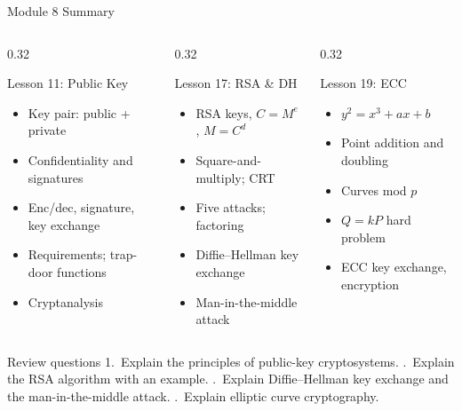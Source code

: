 \documentclass[aspectratio=169,11pt,xcolor={table}]{beamer}
\begin{document}
\begin{frame}{Module 8 Summary}
  \begin{columns}[T]
    \begin{column}{0.32\textwidth}
      \begin{block}{Lesson 11: Public Key}
        \scriptsize
        \begin{itemize}\setlength{\itemsep}{0pt}
          \item Key pair: public + private
          \item Confidentiality and signatures
          \item Enc/dec, signature, key exchange
          \item Requirements; trap-door functions
          \item Cryptanalysis
        \end{itemize}
      \end{block}
    \end{column}
    \begin{column}{0.32\textwidth}
      \begin{alertblock}{Lesson 17: RSA \& DH}
        \scriptsize
        \begin{itemize}\setlength{\itemsep}{0pt}
          \item RSA keys, $C = M^e$, $M = C^d$
          \item Square-and-multiply; CRT
          \item Five attacks; factoring
          \item Diffie--Hellman key exchange
          \item Man-in-the-middle attack
        \end{itemize}
      \end{alertblock}
    \end{column}
    \begin{column}{0.32\textwidth}
      \begin{exampleblock}{Lesson 19: ECC}
        \scriptsize
        \begin{itemize}\setlength{\itemsep}{0pt}
          \item $y^2 = x^3 + ax + b$
          \item Point addition and doubling
          \item Curves mod $p$
          \item $Q = kP$ hard problem
          \item ECC key exchange, encryption
        \end{itemize}
      \end{exampleblock}
    \end{column}
  \end{columns}
  \vspace{2mm}
  \begin{alertblock}{Review questions}
    \small
    1.~Explain the principles of public-key cryptosystems. .~Explain the RSA algorithm with an example. .~Explain Diffie--Hellman key exchange and the man-in-the-middle attack. .~Explain elliptic curve cryptography.
  \end{alertblock}
\end{frame}
\end{document}
